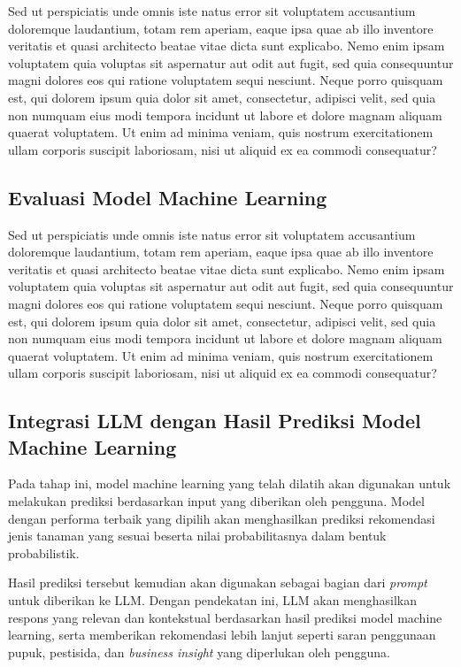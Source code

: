 \documentclass{article} %
\begin{document}
Sed ut perspiciatis unde omnis iste natus error sit voluptatem accusantium doloremque laudantium, totam rem aperiam, eaque ipsa quae ab illo inventore veritatis et quasi architecto beatae vitae dicta sunt explicabo. Nemo enim ipsam voluptatem quia voluptas sit aspernatur aut odit aut fugit, sed quia consequuntur magni dolores eos qui ratione voluptatem sequi nesciunt. Neque porro quisquam est, qui dolorem ipsum quia dolor sit amet, consectetur, adipisci velit, sed quia non numquam eius modi tempora incidunt ut labore et dolore magnam aliquam quaerat voluptatem. Ut enim ad minima veniam, quis nostrum exercitationem ullam corporis suscipit laboriosam, nisi ut aliquid ex ea commodi consequatur? 

\subsection{Evaluasi Model Machine Learning}
Sed ut perspiciatis unde omnis iste natus error sit voluptatem accusantium doloremque laudantium, totam rem aperiam, eaque ipsa quae ab illo inventore veritatis et quasi architecto beatae vitae dicta sunt explicabo. Nemo enim ipsam voluptatem quia voluptas sit aspernatur aut odit aut fugit, sed quia consequuntur magni dolores eos qui ratione voluptatem sequi nesciunt. Neque porro quisquam est, qui dolorem ipsum quia dolor sit amet, consectetur, adipisci velit, sed quia non numquam eius modi tempora incidunt ut labore et dolore magnam aliquam quaerat voluptatem. Ut enim ad minima veniam, quis nostrum exercitationem ullam corporis suscipit laboriosam, nisi ut aliquid ex ea commodi consequatur? 



\subsection{Integrasi LLM dengan Hasil Prediksi Model Machine Learning}
Pada tahap ini, model machine learning yang telah dilatih akan digunakan untuk melakukan prediksi berdasarkan input yang diberikan oleh pengguna. Model dengan performa terbaik yang dipilih akan menghasilkan prediksi rekomendasi jenis tanaman yang sesuai beserta nilai probabilitasnya dalam bentuk probabilistik.

Hasil prediksi tersebut kemudian akan digunakan sebagai bagian dari \textit{prompt} untuk diberikan ke LLM. Dengan pendekatan ini, LLM akan menghasilkan respons yang relevan dan kontekstual berdasarkan hasil prediksi model machine learning, serta memberikan rekomendasi lebih lanjut seperti saran penggunaan pupuk, pestisida, dan \textit{business insight} yang diperlukan oleh pengguna.
\end{document}
